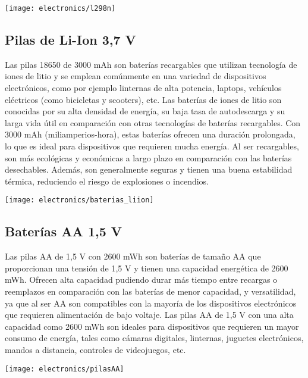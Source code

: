 \begin{center}
  \centering
  \texttt{[image: electronics/l298n]}
  \label{fig:l298n}
\end{center}

\subsection{Pilas de Li-Ion 3,7 V}
Las pilas 18650 de 3000 mAh son baterías recargables que utilizan tecnología de iones de litio y se emplean comúnmente en una variedad de dispositivos electrónicos, como por ejemplo linternas de alta potencia, laptops, vehículos eléctricos (como bicicletas y scooters), etc. Las baterías de iones de litio son conocidas por su alta densidad de energía, su baja tasa de autodescarga y su larga vida útil en comparación con otras tecnologías de baterías recargables. Con 3000 mAh (miliamperios-hora), estas baterías ofrecen una duración prolongada, lo que es ideal para dispositivos que requieren mucha energía. Al ser recargables, son más ecológicas y económicas a largo plazo en comparación con las baterías desechables. Además, son generalmente seguras y tienen una buena estabilidad térmica, reduciendo el riesgo de explosiones o incendios.

\begin{center}
  \centering
  \texttt{[image: electronics/baterias\_liion]}
  \label{fig:baterias_liion}
\end{center}

\subsection{Baterías AA 1,5 V}

Las pilas AA de 1,5 V con 2600 mWh son baterías de tamaño AA que proporcionan una tensión de 1,5 V y tienen una capacidad energética de 2600 mWh. Ofrecen alta capacidad  pudiendo durar más tiempo entre recargas o reemplazos en comparación con las baterías de menor capacidad, y versatilidad, ya que al ser AA son compatibles con la mayoría de los dispositivos electrónicos que requieren alimentación de bajo voltaje.
Las pilas AA de 1,5 V con una alta capacidad como 2600 mWh son ideales para dispositivos que requieren un mayor consumo de energía, tales como cámaras digitales, linternas, juguetes electrónicos, mandos a distancia, controles de videojuegos, etc.
\begin{center}
  \centering
  \texttt{[image: electronics/pilasAA]}
  \label{fig:pilasAA}
\end{center}


